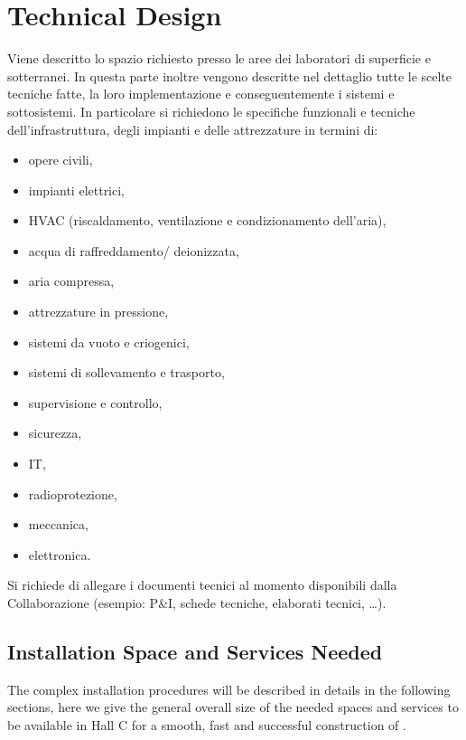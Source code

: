 \section{Technical Design}
\label{sec:TechnicalDesign}

{\bf\color{red}

Viene descritto lo spazio richiesto presso le aree dei laboratori di superficie e sotterranei.
In questa parte inoltre vengono descritte nel dettaglio tutte le scelte tecniche fatte, la loro implementazione e conseguentemente i sistemi e sottosistemi. In particolare si richiedono le specifiche funzionali e tecniche dell’infrastruttura, degli impianti e delle attrezzature in termini di:
\begin{itemize}
\item opere civili, 
\item impianti elettrici, 
\item HVAC (riscaldamento, ventilazione e condizionamento dell’aria), 
\item acqua di raffreddamento/ deionizzata, 
\item aria compressa,
\item attrezzature in pressione, 
\item sistemi da vuoto e criogenici, 
\item sistemi di sollevamento e trasporto, 
\item supervisione e controllo, 
\item sicurezza, 
\item  IT, 
\item radioprotezione, 
\item meccanica, 
\item elettronica.
\end{itemize}
Si richiede di allegare i documenti tecnici al momento disponibili dalla Collaborazione (esempio: P\&I, schede tecniche, elaborati tecnici, …).
}

\subsection{Installation Space and Services Needed}
\label{sec:SpaceAndService}
The complex installation procedures will be described in details in the following sections, here we give the general overall
size of the needed spaces and services to be available in Hall C for a smooth, fast and successful construction of  \DSks.


